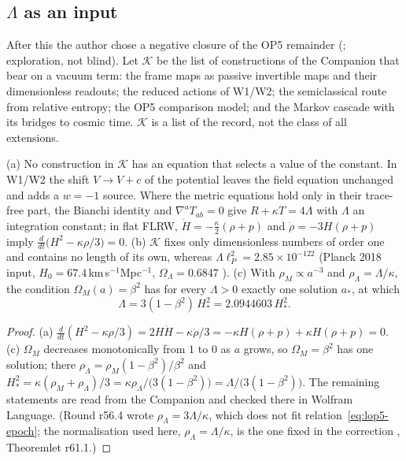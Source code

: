 \subsection{\texorpdfstring{$\Lambda$}{Lambda} as an input}
\label{sec:lop5-input}

After this the author chose a negative closure of the OP5 remainder (; exploration, not blind).  Let $\mathcal K$ be the list of
constructions of the Companion that bear on a vacuum term: the frame maps as passive invertible maps and their dimensionless readouts; the reduced
actions of W1/W2; the semiclassical route from relative entropy; the OP5 comparison model; and the Markov cascade with its bridges to cosmic time.
$\mathcal K$ is a list of the record, not the class of all extensions.

\begin{proposition}
\label{prop:lop5-input}
\textup{(a)} No construction in $\mathcal K$ has an equation that selects a value of the constant.  In W1/W2 the shift $V\to V+c$ of the potential
leaves the field equation unchanged and adds a $w=-1$ source.  Where the metric equations hold only in their trace-free part, the Bianchi identity and
$\nabla^aT_{ab}=0$ give $R+\kappa T=4\Lambda$ with $\Lambda$ an integration constant; in flat FLRW, $\dot H=-\tfrac\kappa2(\rho+p)$ and
$\dot\rho=-3H(\rho+p)$ imply $\tfrac{d}{dt}\bigl(H^2-\kappa\rho/3\bigr)=0$.
\textup{(b)} $\mathcal K$ fixes only dimensionless numbers of order one and contains no length of its own, whereas $\Lambda\ell_P^2=2.85\times10^{-122}$
(Planck 2018 input, $H_0=67.4$\,km\,s$^{-1}$Mpc$^{-1}$, $\Omega_\Lambda=0.6847$ \cite{Planck2018}).
\textup{(c)} With $\rho_M\propto a^{-3}$ and $\rho_\Lambda=\Lambda/\kappa$, the condition $\Omega_M(a)=\beta^2$ has for every $\Lambda>0$ exactly one
solution $a_*$, at which
\begin{equation}
 \Lambda=3(1-\beta^2)\,H_*^2=2.0944603\,H_*^2 .
 \label{eq:lop5-epoch}
\end{equation}
\end{proposition}

\begin{proof}
(a) $\tfrac{d}{dt}(H^2-\kappa\rho/3)=2H\dot H-\kappa\dot\rho/3=-\kappa H(\rho+p)+\kappa H(\rho+p)=0$.  (c) $\Omega_M$ decreases monotonically from
$1$ to $0$ as $a$ grows, so $\Omega_M=\beta^2$ has one solution; there $\rho_\Lambda=\rho_M(1-\beta^2)/\beta^2$ and
$H_*^2=\kappa(\rho_M+\rho_\Lambda)/3=\kappa\rho_\Lambda/\bigl(3(1-\beta^2)\bigr)=\Lambda/\bigl(3(1-\beta^2)\bigr)$.  The remaining statements are read from
the Companion and checked there in Wolfram Language.  (Round r56.4 wrote $\rho_\Lambda=3\Lambda/\kappa$, which does not fit relation~\eqref{eq:lop5-epoch}; the normalisation used here,
$\rho_\Lambda=\Lambda/\kappa$, is the one fixed in the correction , Theoremlet r61.1.)
\end{proof}

